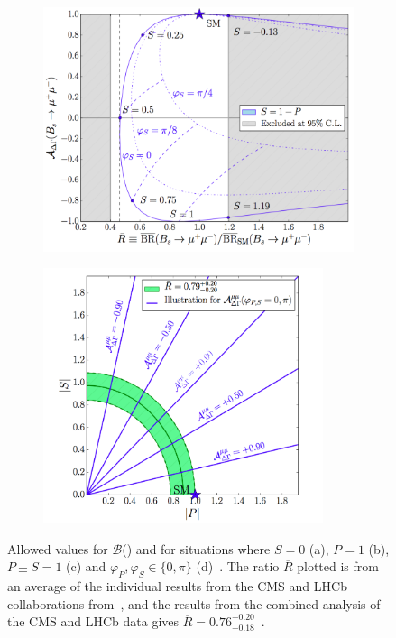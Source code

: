 \begin{figure}
\begin{subfigure}[b]{0.48\textwidth}
    \includegraphics[width=\textwidth]{./Figs/Theory/NP_P_pm_S_1.png}
    \caption{}
    \label{fig:Minnion}
  \end{subfigure}
  \begin{subfigure}[b]{0.48\textwidth}
  \centering

    \includegraphics[width=0.9\textwidth]{./Figs/Theory/NP_phi.png}
    \caption{}
    \label{fig:Minn}
  \end{subfigure}
  \caption{Allowed values for $\mathcal{B}$(\bsmumu) and \ADG for situations where $S=0$ (a), $P=1$ (b), $P \pm S = 1$ (c) and $\varphi_P, \varphi_S \in \{0, \pi\}$ (d)~\cite{Buras:2013uqa,Knegjens:2014zva}. The ratio $\overline{R}$ plotted is from an average of the individual results from the CMS and LHCb collaborations from~\cite{CMSandLHCbCollaborations:2013pla}, and the results from the combined analysis of the CMS and LHCb data gives $\overline{R} = 0.76^{+0.20}_{-0.18}$~\cite{CMS:2014xfa}.}
  \label{fig:NPmodelsB}
\end{figure}




